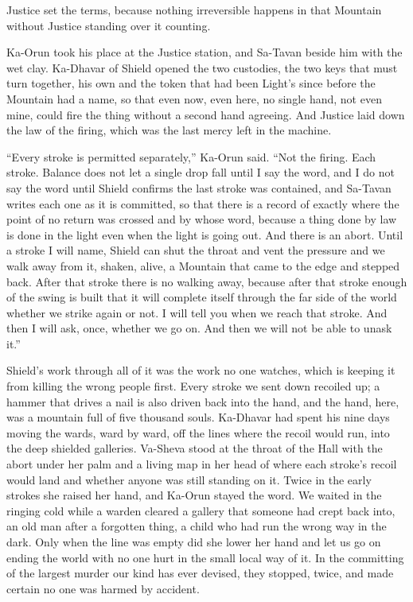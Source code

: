 \ornament

Justice set the terms, because nothing irreversible happens in that Mountain without Justice standing over it counting.\par

Ka-Orun took his place at the Justice station, and Sa-Tavan beside him with the wet clay. Ka-Dhavar of Shield opened the two custodies, the two keys that must turn together, his own and the token that had been Light's since before the Mountain had a name, so that even now, even here, no single hand, not even mine, could fire the thing without a second hand agreeing. And Justice laid down the law of the firing, which was the last mercy left in the machine.\par

``Every stroke is permitted separately,'' Ka-Orun said. ``Not the firing. Each stroke. Balance does not let a single drop fall until I say the word, and I do not say the word until Shield confirms the last stroke was contained, and Sa-Tavan writes each one as it is committed, so that there is a record of exactly where the point of no return was crossed and by whose word, because a thing done by law is done in the light even when the light is going out. And there is an abort. Until a stroke I will name, Shield can shut the throat and vent the pressure and we walk away from it, shaken, alive, a Mountain that came to the edge and stepped back. After that stroke there is no walking away, because after that stroke enough of the swing is built that it will complete itself through the far side of the world whether we strike again or not. I will tell you when we reach that stroke. And then I will ask, once, whether we go on. And then we will not be able to unask it.''\par

Shield's work through all of it was the work no one watches, which is keeping it from killing the wrong people first. Every stroke we sent down recoiled up; a hammer that drives a nail is also driven back into the hand, and the hand, here, was a mountain full of five thousand souls. Ka-Dhavar had spent his nine days moving the wards, ward by ward, off the lines where the recoil would run, into the deep shielded galleries. Va-Sheva stood at the throat of the Hall with the abort under her palm and a living map in her head of where each stroke's recoil would land and whether anyone was still standing on it. Twice in the early strokes she raised her hand, and Ka-Orun stayed the word. We waited in the ringing cold while a warden cleared a gallery that someone had crept back into, an old man after a forgotten thing, a child who had run the wrong way in the dark. Only when the line was empty did she lower her hand and let us go on ending the world with no one hurt in the small local way of it. In the committing of the largest murder our kind has ever devised, they stopped, twice, and made certain no one was harmed by accident.\par

